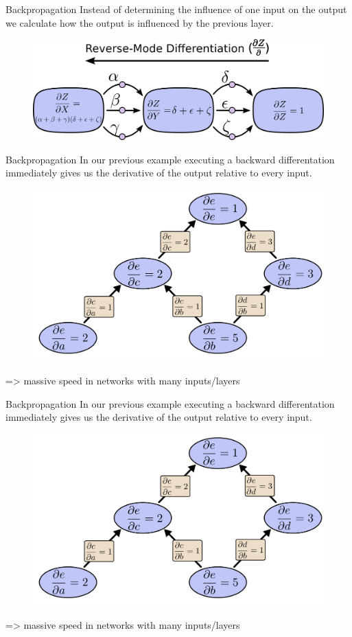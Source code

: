 \documentclass[12pt]{beamer}
\begin{document}
\begin{frame}{Backpropagation}
Instead of determining the influence of one input on the output we calculate how the output is influenced by the previous layer.

\begin{figure}
\centering
\includegraphics[width = 0.4\linewidth]{images/backprop6.png}
\label{fig:propagation5}
\end{figure}

\end{frame}

\begin{frame}{Backpropagation}
In our previous example executing a backward differentation immediately gives us the derivative of the output relative to every input.
 

\begin{figure}
\centering
\includegraphics[width = 0.4\linewidth]{images/backprop7.png}
\label{fig:propagation5}
\end{figure}
=> massive speed in networks with many inputs/layers
\end{frame}

\begin{frame}{Backpropagation}
In our previous example executing a backward differentation immediately gives us the derivative of the output relative to every input.
 

\begin{figure}
\centering
\includegraphics[width = 0.4\linewidth]{images/backprop7.png}
\label{fig:propagation5}
\end{figure}
=> massive speed in networks with many inputs/layers
\end{frame}
\end{document}
